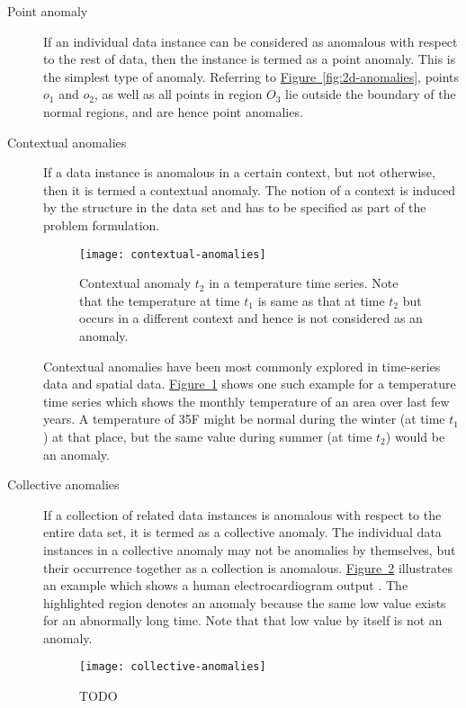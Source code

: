 \begin{description}
\item[Point anomaly] If an individual data instance can be considered as 
anomalous with respect to the rest of data, then the instance is termed as a 
point anomaly. This is the simplest type of anomaly. Referring to 
\hyperref[fig:2d-anomalies]{Figure~\ref{fig:2d-anomalies}}, points $o_{1}$ and 
$o_{2}$, as well as all points in region $O_{3}$ lie outside the boundary of the
normal regions, and are hence point anomalies.

\item[Contextual anomalies] If a data instance is anomalous in a certain 
context, but not otherwise, then it is termed a contextual anomaly. The notion 
of a context is induced by the structure in the data set and has to be specified
as part of the problem formulation.

\begin{figure}
\centering
\texttt{[image: contextual-anomalies]}
\caption{Contextual anomaly $t_{2}$ in a temperature time series. Note that the 
temperature at time $t_{1}$ is same as that at time $t_{2}$ but occurs in a 
different context and hence is not considered as an anomaly.}
\label{fig:contextual-anomalies}
\end{figure}

Contextual anomalies have been most commonly explored in time-series data and 
spatial data. \hyperref[fig:contextual-anomalies]
{Figure~\ref{fig:contextual-anomalies}} shows one such example for a temperature
time series which shows the monthly temperature of an area over last few years. 
A temperature of 35F might be normal during the winter (at time $t_{1}$) at that
place, but the same value during summer (at time $t_{2}$) would be an anomaly.

\item[Collective anomalies] If a collection of related data instances is 
anomalous with respect to the entire data set, it is termed as a collective 
anomaly. The individual data instances in a collective anomaly may not be 
anomalies by themselves, but their occurrence together as a collection is 
anomalous. \hyperref[fig:collective-anomalies]
{Figure~\ref{fig:collective-anomalies}} illustrates an example which shows a 
human electrocardiogram output \cite{Goldberger:2000}. The highlighted region 
denotes an anomaly because the same low value exists for an abnormally long 
time. Note that that low value by itself is not an anomaly.

\begin{figure}
\centering
\texttt{[image: collective-anomalies]}
\caption{TODO}
\label{fig:collective-anomalies}
\end{figure}

\end{description}

